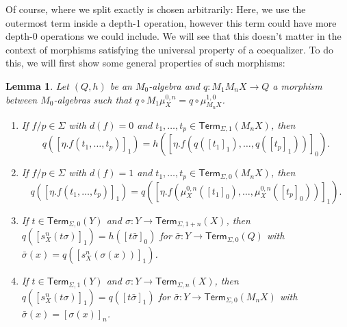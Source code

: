 \documentclass[11pt,a4paper]{amsart}
\newtheorem{lemma}[lemma]{Lemma}
\newcommand{\Term}{\mathsf{Term}}
\newcommand{\sig}{\Sigma}
\theoremstyle{plain}
\numberwithin{equation}{section}
\newcommand{\+}[1]{\mathcal{#1}\xspace}
\theoremstyle{definition}
\begin{document}
Of course, where we split exactly is chosen arbitrarily:
Here, we use the outermost term inside a depth-1 operation, however this term could have more depth-0 operations we could include.
We will see that this doesn't matter in the context of morphisms satisfying the universal property of a coequalizer.
To do this, we will first show some general properties of such morphisms:
\begin{lemma}\label{thm:coequalizerproperties}
    Let \((Q, h)\) be an \(M_0\)-algebra and \(q: M_1 M_n X \to Q\) a morphism between \(M_0\)-algebras such that \(q \circ M_1 \mu^{0, n}_X = q \circ \mu^{1, 0}_{M_n X}\).
    \begin{enumerate}
        \item \label{itm:coequalizerpropertiesdepth0}
            If \(f/p \in \sig\) with \(d(f) = 0\) and \(t_1, \ldots, t_p \in \Term_{\sig, 1}(M_n X)\), then
            \begin{equation*}
                q([\eta.f(t_1, \ldots, t_p)]_1) = h([\eta.f(q([t_1]_1), \ldots, q([t_p]_1))]_0).
            \end{equation*}
        \item \label{itm:coequalizerpropertiesdepth1}
            If \(f/p \in \sig\) with \(d(f) = 1\) and \(t_1, \ldots, t_p \in \Term_{\sig, 0}(M_n X)\), then
            \begin{equation*}
                q([\eta.f(t_1, \ldots, t_p)]_1) = q([\eta.f(\mu^{0, n}_X([t_1]_0), \ldots, \mu^{0, n}_X([t_p]_0))]_1).
            \end{equation*}
        \item \label{itm:substitutionlemmadepth0}
            If \(t \in \Term_{\sig, 0}(Y)\) and \(\sigma: Y \to \Term_{\sig, 1 + n}(X)\), then \(q([s^n_X(t\sigma)]_1) = h([t\bar{\sigma}]_0)\) for \(\bar{\sigma}: Y \to \Term_{\sig, 0}(Q)\) with \(\bar{\sigma}(x) = q([s^n_X(\sigma(x))]_1)\).
        \item \label{itm:substitutionlemmadepth1}
            If \(t \in \Term_{\sig, 1}(Y)\) and \(\sigma: Y \to \Term_{\sig, n}(X)\), then \(q([s^n_X(t\sigma)]_1) = q([t\bar{\sigma}]_1)\) for \(\bar{\sigma}: Y \to \Term_{\sig, 0}(M_n X)\) with \(\bar{\sigma}(x) = [\sigma(x)]_n\).
    \end{enumerate}
\end{lemma}
\end{document}
